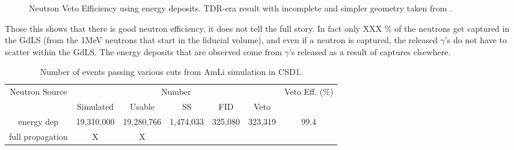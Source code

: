 \begin{figure}[!htbp]
\caption{Neutron Veto Efficiency using energy deposits. TDR-era result with incomplete and simpler geometry taken from \cite{sallyshaw_thesis_ref}.}
\label{fig:neutron_eff_energy_dep_tpc_neutrons}
\end{figure}

\par
Those this shows that there is good neutron efficiency, it does not tell the full story.
In fact only XXX \% of the neutrons get captured in the GdLS (from the 1MeV neutrons that start in the fiducial volume), and even if a neutron is captured, the released $\gamma$'s do not have to scatter within the GdLS.
The energy deposits that are observed come from $\gamma$'s released as a result of captures elsewhere.


\begin{table}[]
    \centering
    \begin{tabular}{c|c|c|c|c|c|c}
         \multirow{2}{*}{Neutron Source} & \multicolumn{5}{c|}{Number}                  & \multirow{2}{*}{Veto Eff. (\%)}  \\ 
                         & Simulated  & Usable     & SS        & FID     & Veto         &                                  \\ \hline
        energy dep       & 19,310,000 & 19,280,766 & 1,474,033 & 325,080 & 323,319      & 99.4                             \\
        full propagation & X          & X          &           &         &              & 
    \end{tabular}
    \caption{Number of events passing various cuts from AmLi simulation in CSD1.}
    \label{tab:neutron_simulation_table_of_cuts}
\end{table}


